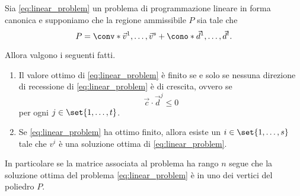 \begin{theorem}
    Sia \eqref{eq:linear_problem} un problema di programmazione lineare in forma canonica e supponiamo che la regione ammissibile $P$ sia tale che \[
        P = \conv*{\vec v^1, \dots, \vec v^s} + \cono*{\vec d^1, \dots, \vec d^t}.  
    \]

    Allora valgono i seguenti fatti.
    \begin{enumerate}
        \item Il valore ottimo di \eqref*{eq:linear_problem} è finito se e solo se nessuna direzione di recessione di \eqref*{eq:linear_problem} è di crescita, ovvero se \[
            \vec c \cdot \vec d^j \leq 0    
        \] per ogni $j \in \set{1, \dots, t}$.
        \item Se \eqref*{eq:linear_problem} ha ottimo finito, allora esiste un $i \in \set{1, \dots, s}$ tale che $v^i$ è una soluzione ottima di \eqref*{eq:linear_problem}.
    \end{enumerate}
\end{theorem}

In particolare se la matrice associata al problema ha rango $n$ segue che la soluzione ottima del problema \eqref*{eq:linear_problem} è in uno dei vertici del poliedro $P$.